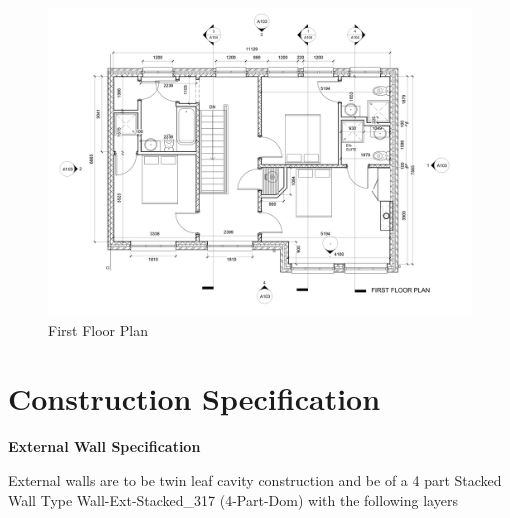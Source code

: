 \begin{figure}[th]
	\centering
	\includegraphics[width=1.0\linewidth]{./Assignments/img/P01FirstFloorLevel.jpg}
	\caption{First Floor Plan}
	\label{fig:p01firstfloorlevel}
\end{figure}


\newpage

\section*{Construction Specification}


\textbf{External Wall Specification} 

External walls are to be twin leaf cavity construction and be of a 4 part Stacked Wall Type
Wall-Ext-Stacked\_317 (4-Part-Dom) with the following layers

